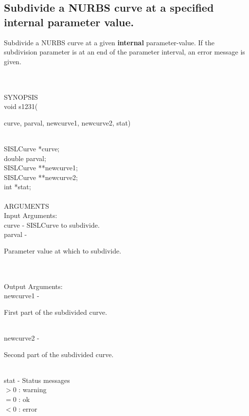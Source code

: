 \subsection{Subdivide a NURBS curve at a specified internal parameter value.}
\begin{minipg1}
Subdivide a NURBS curve at a given {\bf internal} parameter-value. If the subdivision parameter is at an end of the parameter interval, an error message is given.
\end{minipg1} \\ \\
SYNOPSIS\\
	\>void s1231(\begin{minipg3}
	{\fov curve}, {\fov parval}, {\fov newcurve1}, {\fov newcurve2}, {\fov stat})
		\end{minipg3}\\[0.3ex]
		\>\>	SISLCurve 	\>	*{\fov curve};\\
		\>\>	double 	\>	{\fov parval};\\
		\>\>	SISLCurve 	\>	**{\fov newcurve1};\\
		\>\>	SISLCurve 	\>	**{\fov newcurve2};\\
		\>\>	int 	\>	*{\fov stat};\\
\\
ARGUMENTS\\
	\>Input Arguments:\\
	\>\>	{\fov curve}	\> - \>	SISLCurve to subdivide.\\
	\>\>	{\fov parval}	\> - \>	\begin{minipg2}
				Parameter value at which to subdivide.
				\end{minipg2}\\
\\
	\>Output Arguments:\\
	\>\>	{\fov newcurve1}\> - \>\begin{minipg2}
				First part of the subdivided curve.
				\end{minipg2}\\
	\>\>	{\fov newcurve2}\> - \>\begin{minipg2}
				Second part of the subdivided curve. 
				\end{minipg2}\\[0.3ex]
	\>\>	{\fov stat}	\> - \>	Status messages\\
		\>\>\>\>\>		$> 0$	: warning\\
		\>\>\>\>\>		$= 0$	: ok\\
		\>\>\>\>\>		$< 0$	: error\\
